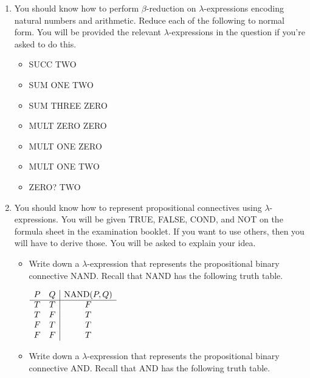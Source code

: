 \documentclass[11pt]{report}
\begin{document}
\begin{enumerate}
	\item You should know how to perform $\beta$-reduction on $\lambda$-expressions encoding natural numbers and arithmetic. Reduce each of the following to normal form. You will be provided the relevant $\lambda$-expressions in the question if you're asked to do this. 
	
		\begin{itemize}
			\item SUCC TWO
			\item SUM ONE TWO
			\item SUM THREE ZERO 
			\item MULT ZERO ZERO 
			\item MULT ONE ZERO 
			\item MULT ONE TWO
			\item ZERO? TWO
		\end{itemize}

	\newpage
	\item You should know how to represent propositional connectives using $\lambda$-expressions. You will be given TRUE, FALSE, COND, and NOT on the formula sheet in the examination booklet. If you want to use others, then you will have to derive those. You will be asked to explain your idea. 
	
		\begin{itemize}

			\item Write down a $\lambda$-expression that represents the propositional binary connective NAND. Recall that NAND has the following truth table.
			
			\vspace{0.5cm}
	
				$\begin{array}{ c c | c }			
					P & Q & \text{NAND}(P,Q)\\
					\cline{1 - 3}
					T & T & F \\ 
					T & F & T \\ 
					F & T & T \\ 
					F & F & T
				\end{array}$
		
			\vspace{0.5cm}
			\item Write down a $\lambda$-expression that represents the propositional binary connective AND. Recall that AND has the following truth table.
			
			\vspace{0.5cm}
	

\end{itemize}
\end{enumerate}
\end{document}
